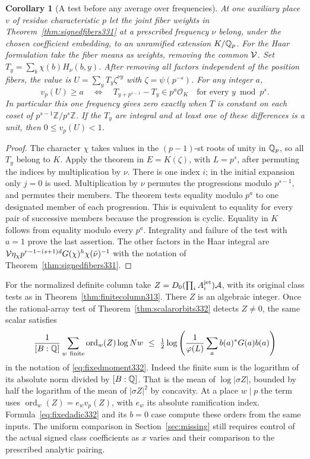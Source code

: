 \documentclass[a4paper,11pt]{article}
\newtheorem{corollary}[proposition]{Corollary}
\theoremstyle{definition}
\theoremstyle{remark}
\newcommand{\ZZ}{\mathbb Z}\newcommand{\ord}{\operatorname{ord}}
\numberwithin{equation}{section}
\begin{document}
\begin{corollary}[A test before any average over frequencies]\leavevmode
\label{cor:unramtest332}
At one auxiliary place \(v\) of residue characteristic \(p\)
let the joint fiber weights in Theorem~\ref{thm:signedfibers331}
at a prescribed frequency \(\nu\) belong, under the chosen
coefficient embedding, to an unramified extension \(K/\mathbb Q_p\).
For the Haar formulation take the fiber means as weights, removing
the common \({\cal V}\). Set \(T_y=\sum_b\chi(b)H_\nu(b,y)\).
After removing all factors independent of the position fibers,
the value is \(U=\sum_yT_y\zeta^{\nu y}\) with
\(\zeta=\psi(p^{-s})\). For any integer \(a\),
\[
 v_p(U)\ge a\quad\Longleftrightarrow\quad
 T_{y+p^{s-1}}-T_y\in p^a\mathcal O_K\quad
            \text{for every }y\bmod p^s .
\]
In particular this one frequency gives zero exactly when \(T\)
is constant on each coset of \(p^{s-1}\ZZ/p^s\ZZ\). If the \(T_y\)
are integral and at least one of these differences is a unit, then
\(0\le v_p(U)<1\).
\end{corollary}
\begin{proof}
The character \(\chi\) takes values in the \((p-1)\)-st roots of
unity in \(\mathbb Q_p\), so all \(T_y\) belong to \(K\). Apply the
theorem in \(E=K(\zeta)\), with \(L=p^s\), after permuting the
indices by multiplication by \(\nu\). There is one index \(i\);
in the initial expansion only \(j=0\) is used. Multiplication by
\(\nu\) permutes the progressions modulo \(p^{s-1}\), and permutes
their members. The theorem tests equality modulo \(p^a\) to one
designated member of each progression. This is equivalent to equality
for every pair of successive members because the progression is cyclic.
Equality in \(K\) follows from equality modulo every \(p^a\).
Integrality and failure of the test with \(a=1\) prove the last
assertion. The other factors in the Haar integral are
\({\cal V}\eta_\chi p^{r-1-(s+1)d}G(\chi)^h\chi(\bar\nu)^{-1}\)
with the notation of Theorem~\ref{thm:signedfibers331}.
\end{proof}

For the normalized definite column take
\(Z=D_0(\prod_i A_i^{\rm jet})\mathcal A\), with its original
class tests as in Theorem~\ref{thm:finitecolumn313}. There \(Z\)
is an algebraic integer. Once the rational-array test of
Theorem~\ref{thm:scalarorbits332} detects \(Z\ne0\), the same
scalar satisfies
\[
 \frac{1}{[B:\mathbb Q]}\sum_{w\ {\rm finite}}
       \operatorname{ord}_w(Z)\log Nw
 \ \le\ \tfrac12\log\left(\frac1{\varphi(L)}
                      \sum_a b(a)^*G(a)b(a)\right)
\]
in the notation of \eqref{eq:fixedmoment332}. Indeed the finite
sum is the logarithm of its absolute norm divided by \([B:\mathbb Q]\).
That is the mean of \(\log|\sigma Z|\), bounded by half the logarithm
of the mean of \(|\sigma Z|^2\) by concavity. At a place \(w\mid p\)
the term uses \(\operatorname{ord}_w(Z)=e_w v_p(Z)\), with \(e_w\)
its absolute ramification index. Formula~\eqref{eq:fixedadic332}
and its \(b=0\) case compute these orders from the same inputs.
The uniform comparison in Section~\ref{sec:missing} still requires
control of the actual signed class coefficients as \(x\) varies
and their comparison to the prescribed analytic pairing.
\end{document}
